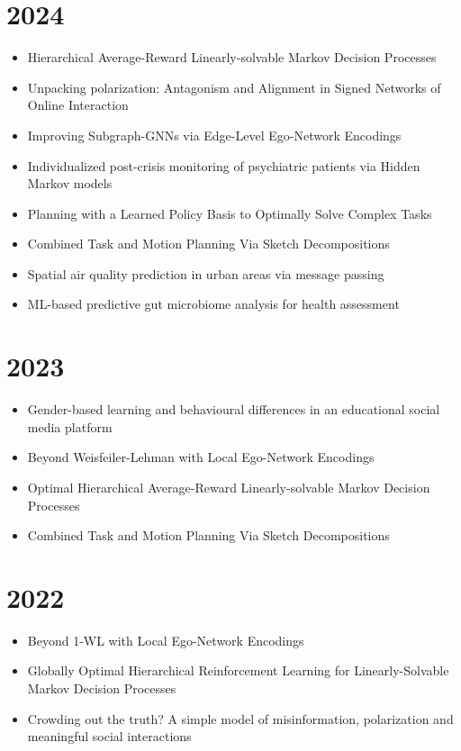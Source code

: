 \documentclass{article}
\begin{document}
\section*{2024}
\begin{itemize}
\item Hierarchical Average-Reward Linearly-solvable Markov Decision Processes~\cite{infante2024ecai}
\item Unpacking polarization: Antagonism and Alignment in Signed Networks of Online Interaction~\cite{fraxanet-PNASNEXUS24}
\item Improving Subgraph-GNNs via Edge-Level Ego-Network Encodings~\cite{alvarez-TMLR24}
\item Individualized post-crisis monitoring of psychiatric patients via Hidden Markov models~\cite{garriga2024}
\item Planning with a Learned Policy Basis to Optimally Solve Complex Tasks~\cite{KuricInfante_ICAPS24}
\item Combined Task and Motion Planning Via Sketch Decompositions~\cite{dalmau-ICAPS24}
\item Spatial air quality prediction in urban areas via message passing~\cite{CALO2024108191}
\item ML-based predictive gut microbiome analysis for health assessment~\cite{SORRIBES20241452}
\end{itemize}


\section*{2023}
\begin{itemize}
\item Gender-based learning and behavioural differences in an educational social media platform~\cite{theophilou2023}
\item Beyond Weisfeiler-Lehman with Local Ego-Network Encodings~\cite{make5040063}
\item Optimal Hierarchical Average-Reward Linearly-solvable Markov Decision Processes~\cite{molina2023optimal}
\item Combined Task and Motion Planning Via Sketch Decompositions~\cite{dalmau-planrob-2023}
\end{itemize}

\section*{2022}

\begin{itemize}
\item Beyond 1-WL with Local Ego-Network Encodings~\cite{alvarez-gonzalez2022beyond}
\item Globally Optimal Hierarchical Reinforcement Learning for Linearly-Solvable Markov Decision Processes~\cite{infante2022globally}
\item Crowding out the truth? A simple model of misinformation, polarization and meaningful social interactions~\cite{fabrizio-ic2s2-2022}
\end{itemize}
\end{document}
